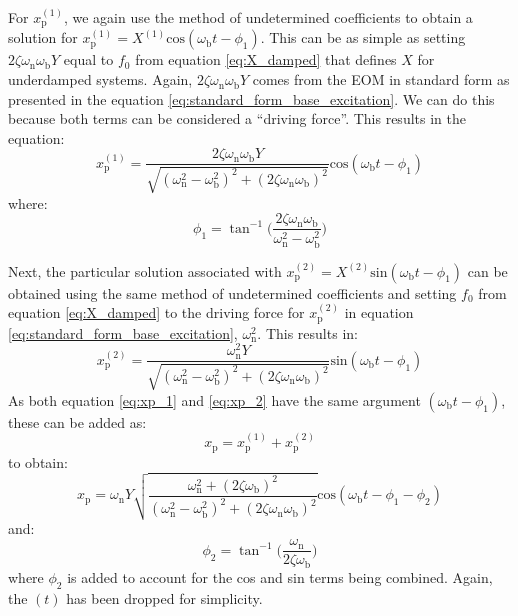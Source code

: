 \documentclass[12pt,letter]{article}
\begin{document}
  For $x_\text{p}^{(1)}$, we again use the method of undetermined coefficients to obtain a solution for $x_\text{p}^{(1)} = X^{(1)}\text{cos}(\omega_\text{b} t - \phi_1)$. This can be as simple as setting $2 \zeta \omega_\text{n} \omega_\text{b} Y$ equal to $f_0$ from equation \ref{eq:X_damped} that defines $X$ for underdamped systems. Again, $2 \zeta \omega_\text{n} \omega_\text{b} Y$  comes from the EOM in standard form as presented in the equation  
  \ref{eq:standard_form_base_excitation}. We can do this because both terms can be considered a ``driving force''. This results in the equation:
  \begin{equation}
   x_\text{p}^{(1)} = \frac{2 \zeta \omega_\text{n} \omega_\text{b} Y}{\sqrt{(\omega_\text{n}^2 - \omega_\text{b}^2)^2 +  (2\zeta \omega_\text{n} \omega_\text{b})^2}}  \text{cos}(\omega_\text{b} t - \phi_1)
   \label{eq:xp_1}
  \end{equation}
  where:
  \begin{equation}
   \phi_1 = \tan^{-1} \bigg(\frac{2\zeta \omega_\text{n} \omega_\text{b}}{\omega_\text{n}^2 - \omega_\text{b}^2}\bigg)
  \end{equation}
  
  Next, the particular solution associated with $x_\text{p}^{(2)} = X^{(2)} \text{sin}(\omega_\text{b} t - \phi_1)$ can be obtained using the same method of undetermined coefficients and setting $f_0$ from equation \ref{eq:X_damped} to the driving force for $x_\text{p}^{(2)}$ in equation  \ref{eq:standard_form_base_excitation}, $\omega_\text{n}^2$. This results in:
  \begin{equation}
   x_\text{p}^{(2)} = \frac{\omega_\text{n}^2 Y}{\sqrt{(\omega_\text{n}^2 - \omega_\text{b}^2)^2 +  (2\zeta \omega_\text{n} \omega_\text{b})^2}}  \text{sin}(\omega_\text{b} t - \phi_1)
   \label{eq:xp_2}
  \end{equation}
  As both equation \ref{eq:xp_1} and \ref{eq:xp_2}  have the same argument $(\omega_\text{b} t - \phi_1)$, these can be added as:
  \begin{equation}
   x_\text{p} =  x_\text{p}^{(1)} + x_\text{p}^{(2)}
  \end{equation}
  to obtain:
  \begin{equation}
   x_\text{p} =  \omega_\text{n} Y   \sqrt{\frac{\omega_\text{n}^2 + (2 \zeta \omega_\text{b})^2 }{(\omega_\text{n}^2 - \omega_\text{b}^2)^2 +  (2\zeta \omega_\text{n} \omega_\text{b})^2} }  \text{cos}(\omega_\text{b}t - \phi_1 - \phi_2)
  \end{equation}
  and:
  \begin{equation}
   \phi_2 = \tan^{-1} \bigg(\frac{\omega_\text{n}}{2\zeta \omega_\text{b}}\bigg)
  \end{equation}
  where $\phi_2$ is added to account for the cos and sin terms being combined. Again, the $(t)$ has been dropped for simplicity. 
  
\end{document}
